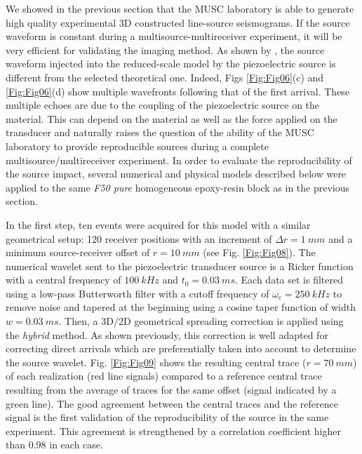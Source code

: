 \documentclass[extra,mreferee]{gji}
\newenvironment{orangenote}{\par\color{Orange}}{\par}
\begin{document}
\begin{orangenote}
We showed in the previous section that the MUSC laboratory is able to generate high quality experimental 3D constructed line-source seismograms. If the source waveform is constant during a multisource-multireceiver experiment, it will be very efficient for validating the imaging method. As shown by \cite{bretaudeau2011ssm}, the source waveform injected into the reduced-scale model by the piezoelectric source is different from the selected theoretical one. Indeed, Figs \ref{Fig:Fig06}(c) and \ref{Fig:Fig06}(d) show multiple wavefronts following that of the first arrival. These multiple echoes are due to the coupling of the piezoelectric source on the material. This can depend on the material as well as the force applied on the transducer and naturally raises the question of the ability of the MUSC laboratory to provide reproducible sources during a complete multisource/multireceiver experiment. In order to evaluate the reproducibility of the source impact, several numerical and physical models described below were applied to the same \textit{F50 pure} homogeneous epoxy-resin block as in the previous section.

In the first step, ten events were acquired for this model with a similar geometrical setup: 120 receiver positions with an increment of $\Delta r= 1\ mm$ and a minimum source-receiver offset of $r=10\ mm$ (see Fig. \ref{Fig:Fig08}). The numerical wavelet sent to the piezoelectric transducer source is a Ricker function with a central frequency of $100\ kHz$ and $t_{0}=0.03\ ms$. Each data set is filtered using a low-pass Butterworth filter with a cutoff frequency of $\omega_{c}=250\ kHz$ to remove noise and tapered at the beginning using a cosine taper function of width $w=0.03\ ms$. Then, a 3D/2D geometrical spreading correction is applied using the \textit{hybrid} method. As shown previously, this correction is well adapted for correcting direct arrivals which are preferentially taken into account to determine the source wavelet. Fig. \ref{Fig:Fig09} shows the resulting central trace ($r=70\ mm$) of each realization (red line signals) compared to a reference central trace resulting from the average of traces for the same offset (signal indicated by a green line). The good agreement between the central traces and the reference signal is the first validation of the reproducibility of the source in the same experiment. This agreement is strengthened by a correlation coefficient higher than $0.98$ in each case. 


\end{orangenote}
\end{document}
